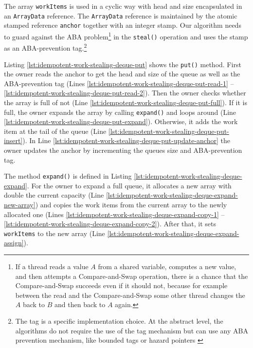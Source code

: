 The array \lstinline!workItems! is used in a cyclic way with head and
size encapsulated in an \lstinline!ArrayData! reference. The
\lstinline!ArrayData! reference is maintained by the atomic stamped
reference \lstinline!anchor! together with an integer stamp. Our
algorithm needs to guard against the ABA problem\footnote{If a thread
  reads a value $A$ from a shared variable, computes a new value, and
  then attempts a Compare-and-Swap operation, there is a chance that
  the Compare-and-Swap succeeds even if it should not, because for
  example between the read and the Compare-and-Swap some other thread
  changes the $A$ back to $B$ and then back to $A$ again.} in the
\lstinline!steal()! operation and uses the stamp as an ABA-prevention
tag.\footnote{The tag is a specific implementation choice. At the
  abstract level, the algorithms do not require the use of the tag
  mechanism but can use any ABA prevention mechanism, like bounded
  tags \cite{Moir1997} or hazard pointers \cite{Michael2004}}

Listing \ref{lst:idempotent-work-stealing-deque-put} shows the
\lstinline!put()! method. First the owner reads the anchor to get the
head and size of the queue as well as the ABA-prevention tag (Lines
\ref{lst:idempotent-work-stealing-deque-put-read-1} --
\ref{lst:idempotent-work-stealing-deque-put-read-2}). Then the owner
checks whether the array is full of not (Line
\ref{lst:idempotent-work-stealing-deque-put-full}). If it is full, the
owner expands the array by calling \lstinline!expand()! and loops
around (Line
\ref{lst:idempotent-work-stealing-deque-put-expand}). Otherwise, it
adds the work item at the tail of the queue (Line
\ref{lst:idempotent-work-stealing-deque-put-insert}). In Line
\ref{lst:idempotent-work-stealing-deque-put-update-anchor} the owner
updates the anchor by incrementing the queues size and ABA-prevention
tag.



The method \lstinline!expand()! is defined in Listing
\ref{lst:idempotent-work-stealing-deque-expand}. For the owner to
expand a full queue, it allocates a new array with double the current
capacity (Line
\ref{lst:idempotent-work-stealing-deque-expand-new-array}) and copies
the work items from the current array to the newly allocated one
(Lines \ref{lst:idempotent-work-stealing-deque-expand-copy-1} --
\ref{lst:idempotent-work-stealing-deque-expand-copy-2}). After that,
it sets \lstinline!workItems! to the new array (Line
\ref{lst:idempotent-work-stealing-deque-expand-assign}).


